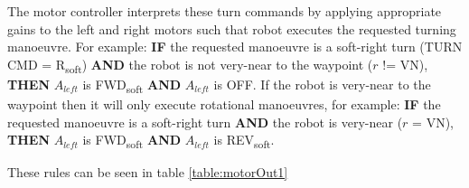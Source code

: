 \documentclass[10pt]{article}
\begin{document}
The motor controller interprets these turn commands by applying appropriate gains to the left and right motors such that robot executes the requested turning manoeuvre.
For example: \textbf{IF} the requested manoeuvre is a soft-right turn (TURN CMD = R\textsubscript{soft}) \textbf{AND} the robot is not very-near to the waypoint ($r$ != VN), \textbf{THEN} $A_{left}$ is FWD\textsubscript{soft} \textbf{AND} $A_{left}$ is OFF.
If the robot is very-near to the waypoint then it will only execute rotational manoeuvres, for example:
\textbf{IF} the requested manoeuvre is a soft-right turn \textbf{AND} the robot is very-near ($r$ = VN), \textbf{THEN} $A_{left}$ is FWD\textsubscript{soft} \textbf{AND} $A_{left}$ is REV\textsubscript{soft}.

These rules can be seen in table \ref{table:motorOut1}
\end{document}
